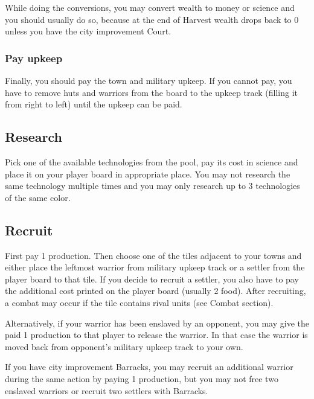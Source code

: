\documentclass[11pt,a4paper,titlepage]{article}
\begin{document}
{{{      While doing the conversions, you may convert wealth to money or science
      and you should usually do so, because at the end of Harvest wealth drops
      back to 0 unless you have the city improvement Court.
    }\label{subsubsec:convert_cubes}

    \subsubsection{Pay upkeep}{
      Finally, you should pay the town and military upkeep. If you cannot pay,
      you have to remove huts and warriors from the board to the upkeep track
      (filling it from right to left) until the upkeep can be paid.
    }\label{subsubsec:pay_upkeep}

  }\label{subsec:harvest}
  \subsection{Research}{
    Pick one of the available technologies from the pool, pay its cost
    in science and place it on your player board in appropriate place. You
    may not research the same technology multiple times and you may only
    research up to 3 technologies of the same color.
  }\label{subsec:research}
  \subsection{Recruit}{
    First pay 1 production. Then choose one of the tiles adjacent to your
    towns and either place the leftmost warrior from military upkeep track
    or a settler from the player board to that tile. If you decide to recruit
    a settler, you also have to pay the additional cost printed on the player
    board (usually 2 food). After recruiting, a combat may occur if the tile
    contains rival units (see Combat section).

    Alternatively, if your warrior has been enslaved by an opponent, you may
    give the paid 1 production to that player to release the warrior. In that
    case the warrior is moved back from opponent's military upkeep track to
    your own.

    If you have city improvement Barracks, you may recruit an additional
    warrior during the same action by paying 1 production, but you may not
    free two enslaved warriors or recruit two settlers with Barracks.
  }\label{subsec:recruit}
}
\end{document}
